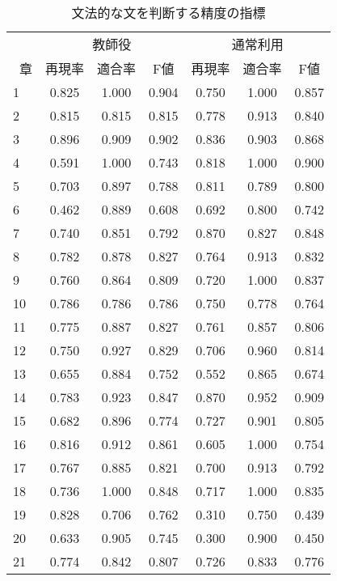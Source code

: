 \begin{table}[H]  %
    \centering
    \small
    \tabcolsep 3pt
    \caption{文法的な文を判断する精度の指標}
    \label{tab:sample2}
    \begin{tabular}{lcccccc}
    \hline
    \multicolumn{1}{l}{} & \multicolumn{3}{c}{教師役} & \multicolumn{3}{c}{通常利用}\\
    \      章 & 再現率 & 適合率 &F値 & 再現率 & 適合率 &F値\\
    \hline
    1 & 0.825 & 1.000 & 0.904 & 0.750 & 1.000 & 0.857 \\ 
    2 & 0.815 & 0.815 & 0.815 & 0.778 & 0.913 & 0.840 \\ 
    3 & 0.896 & 0.909 & 0.902 & 0.836 & 0.903 & 0.868 \\ 
    4 & 0.591 & 1.000 & 0.743 & 0.818 & 1.000 & 0.900 \\ 
    5 & 0.703 & 0.897 & 0.788 & 0.811 & 0.789 & 0.800 \\ 
    6 & 0.462 & 0.889 & 0.608 & 0.692 & 0.800 & 0.742 \\ 
    7 & 0.740 & 0.851 & 0.792 & 0.870 & 0.827 & 0.848 \\ 
    8 & 0.782 & 0.878 & 0.827 & 0.764 & 0.913 & 0.832 \\ 
    9 & 0.760 & 0.864 & 0.809 & 0.720 & 1.000 & 0.837 \\ 
    10 & 0.786 & 0.786 & 0.786 & 0.750 & 0.778 & 0.764 \\ 
    11 & 0.775 & 0.887 & 0.827 & 0.761 & 0.857 & 0.806 \\ 
    12 & 0.750 & 0.927 & 0.829 & 0.706 & 0.960 & 0.814 \\ 
    13 & 0.655 & 0.884 & 0.752 & 0.552 & 0.865 & 0.674 \\ 
    14 & 0.783 & 0.923 & 0.847 & 0.870 & 0.952 & 0.909 \\ 
    15 & 0.682 & 0.896 & 0.774 & 0.727 & 0.901 & 0.805 \\ 
    16 & 0.816 & 0.912 & 0.861 & 0.605 & 1.000 & 0.754 \\ 
    17 & 0.767 & 0.885 & 0.821 & 0.700 & 0.913 & 0.792 \\
    18 & 0.736 & 1.000 & 0.848 & 0.717 & 1.000 & 0.835 \\
    19 & 0.828 & 0.706 & 0.762 & 0.310 & 0.750 & 0.439 \\
    20 & 0.633 & 0.905 & 0.745 & 0.300 & 0.900 & 0.450 \\
    21 & 0.774 & 0.842 & 0.807 & 0.726 & 0.833 & 0.776 \\

\end{tabular}
\end{table}
